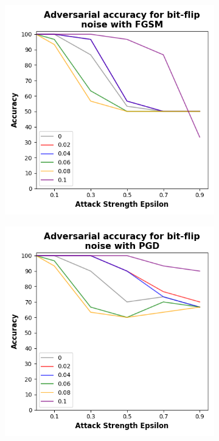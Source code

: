 \begin{figure}[!h]
  \begin{subfigure}{0.45\textwidth}
      \includegraphics[width=\linewidth]{figures/evaluation_results/iris/pqc/figures/bit-flip-fgsm.png}
      \label{fig:iris7}
  \end{subfigure} \qquad
  \begin{subfigure}{0.45\textwidth}
      \includegraphics[width=\linewidth]{figures/evaluation_results/iris/pqc/figures/bit-flip-pgd.png}
      \label{fig:iris8}
  \end{subfigure}


\end{figure}
